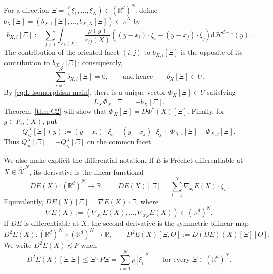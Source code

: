 \documentclass[11pt]{article}
\def\R{\mathbb{R}}
\def\Xc{{\mathcal X}}
\def\hX{\widehat{\Xc}^{\,N}}
\newcommand{\dd}{\mathrm{d}}
\newcommand{\HH}{\mathcal H}
\theoremstyle{definition}
\theoremstyle{remark}
\numberwithin{equation}{section}
\begin{document}
For a direction $\Xi=(\xi_1,\ldots,\xi_N)\in(\R^d)^N$, define
$b_X[\Xi]=(b_{X,1}[\Xi],\ldots,b_{X,N}[\Xi])\in\R^N$ by
\begin{equation}\label{eq:bX-main}
 b_{X,i}[\Xi]:=\sum_{j\ne i}
 \int_{F_{ij}(X)}\frac{\rho(y)}{r_{ij}(X)}
 \left((y-x_i)\cdot\xi_i-(y-x_j)\cdot\xi_j\right)
 \dd\HH^{d-1}(y).
\end{equation}
The contribution of the oriented facet $(i,j)$ to $b_{X,i}[\Xi]$ is the opposite of its
contribution to $b_{X,j}[\Xi]$; consequently,
\begin{equation}\label{eq:bX-in-U-main}
 \sum_{i=1}^Nb_{X,i}[\Xi]=0,
 \qquad\text{and hence}\qquad b_X[\Xi]\in U.
\end{equation}
By \eqref{eq:L-isomorphism-main}, there is a unique vector
$\dot\Phi_X[\Xi]\in U$ satisfying
\begin{equation}\label{eq:linearized-weights-main}
 L_X\dot\Phi_X[\Xi]=-b_X[\Xi].
\end{equation}
Theorem~\ref{thm:C2} will show that
$\dot\Phi_X[\Xi]=D\Phi^*(X)[\Xi]$.  Finally, for $y\in F_{ij}(X)$, put
\begin{equation}\label{eq:Q-main}
 Q_{ij}^X[\Xi](y):=(y-x_i)\cdot\xi_i-(y-x_j)\cdot\xi_j
 +\dot\Phi_{X,i}[\Xi]-\dot\Phi_{X,j}[\Xi].
\end{equation}
Thus $Q_{ji}^X[\Xi]=-Q_{ij}^X[\Xi]$ on the common facet.

We also make explicit the differential notation.  If $E$ is Fr\'echet differentiable at
$X\in\hX$, its derivative is the linear functional
\begin{equation}\label{eq:DE-definition-main}
 DE(X):(\R^d)^N\longrightarrow\R,
 \qquad
 DE(X)[\Xi]=\sum_{i=1}^N\nabla_{x_i}E(X)\cdot\xi_i.
\end{equation}
Equivalently,
$DE(X)[\Xi]=\nabla E(X)\cdot\Xi$, where
\begin{equation}\label{eq:full-gradient-definition-main}
 \nabla E(X):=(\nabla_{x_1}E(X),\ldots,\nabla_{x_N}E(X))\in(\R^d)^N.
\end{equation}
If $DE$ is differentiable at $X$, the second derivative is the symmetric bilinear map
\begin{equation}\label{eq:D2E-definition-main}
 D^2E(X):(\R^d)^N\times(\R^d)^N\longrightarrow\R,
 \qquad
 D^2E(X)[\Xi,\Theta]:=D(DE)(X)[\Xi][\Theta].
\end{equation}
We write $D^2E(X)\preccurlyeq P$ when
\begin{equation}\label{eq:Hessian-order-definition-main}
 D^2E(X)[\Xi,\Xi]\le \Xi\cdot P\Xi
 =\sum_{i=1}^Np_i|\xi_i|^2
 \qquad\text{for every }\Xi\in(\R^d)^N.
\end{equation}
\end{document}
